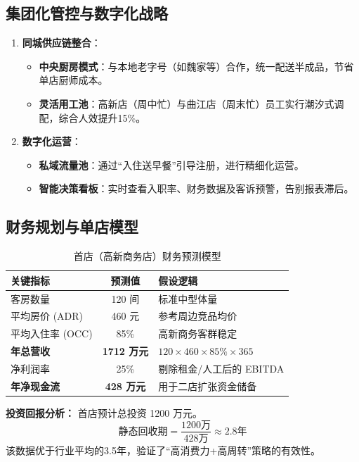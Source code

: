 \documentclass{cumcmthesis}
\begin{document}
\subsection{集团化管控与数字化战略}
\begin{enumerate}
    \item \textbf{同城供应链整合}：
    \begin{itemize}
        \item \textbf{中央厨房模式}：与本地老字号（如魏家等）合作，统一配送半成品，节省单店厨师成本。
        \item \textbf{灵活用工池}：高新店（周中忙）与曲江店（周末忙）员工实行潮汐式调配，综合人效提升15\%。
    \end{itemize}
    \item \textbf{数字化运营}：
    \begin{itemize}
        \item \textbf{私域流量池}：通过“入住送早餐”引导注册，进行精细化运营。
        \item \textbf{智能决策看板}：实时查看入职率、财务数据及客诉预警，告别报表滞后。
    \end{itemize}
\end{enumerate}

\subsection{财务规划与单店模型}
\begin{table}[H]
    \centering
    \caption{首店（高新商务店）财务预测模型}
    \begin{tabular}{l c l}
        \toprule
        \textbf{关键指标} & \textbf{预测值} & \textbf{假设逻辑} \\
        \midrule
        客房数量 & 120 间 & 标准中型体量 \\
        平均房价 (ADR) & 460 元 & 参考周边竞品均价 \\
        平均入住率 (OCC) & 85\% & 高新商务客群稳定 \\
        \textbf{年总营收} & \textbf{1712 万元} & $120 \times 460 \times 85\% \times 365$ \\
        净利润率 & 25\% & 剔除租金/人工后的 EBITDA \\
        \textbf{年净现金流} & \textbf{428 万元} & 用于二店扩张资金储备 \\
        \bottomrule
    \end{tabular}
\end{table}

\textbf{投资回报分析：} 首店预计总投资 1200 万元。
\[
\text{静态回收期} = \frac{1200\text{万}}{428\text{万}} \approx 2.8 \text{年}
\]
该数据优于行业平均的3.5年，验证了“高消费力+高周转”策略的有效性。
\end{document}
